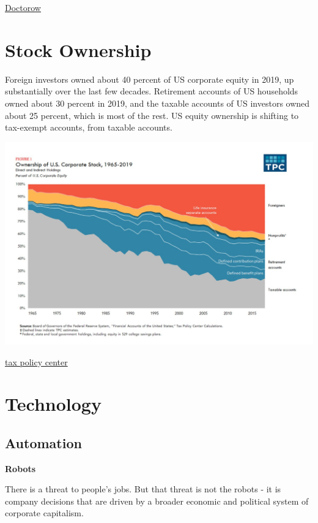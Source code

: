 \documentclass[
]{book}
\begin{document}
\href{https://pluralistic.net/2021/04/13/public-interest-pharma/\#gates-foundation}{Doctorow}

\hypertarget{stock-ownership}{%
\chapter{Stock Ownership}\label{stock-ownership}}

Foreign investors owned about 40 percent of US corporate equity in 2019, up substantially over the last few decades. Retirement accounts of US households owned about 30 percent in 2019, and the taxable accounts of US investors owned about 25 percent, which is most of the rest.
US equity ownership is shifting to tax-exempt accounts, from taxable accounts.

\includegraphics{fig/Ownership_1965-2019_US_Corp_Stock.jpeg}

\href{https://www.taxpolicycenter.org/taxvox/who-owns-us-stock-foreigners-and-rich-americans}{tax policy center}

\hypertarget{technology}{%
\chapter{Technology}\label{technology}}

\hypertarget{automation}{%
\section{Automation}\label{automation}}

\textbf{Robots}

There is a threat to people's jobs. But that threat is not the robots - it is company decisions that are driven by a broader economic and political system of corporate capitalism.
\end{document}
